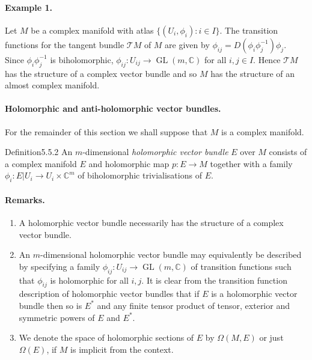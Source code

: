 \paragraph{Example 1.} Let $M$ be a complex manifold with atlas $\{(U_i,\phi_i):i\in I\}$. The transition functions for the tangent bundle $\mathcal TM$ of $M$ are given by $\phi_{ij}=D(\phi_i\phi_j^{-1})\phi_j$. Since $\phi_i\phi_j^{-1}$ is biholomorphic, $\phi_{ij}:U_{ij}\to\operatorname{GL}(m,\mathbb C)$ for all $i,j\in I$. Hence $\mathcal TM$ has the structure of a complex vector bundle and so $M$ has the structure of an almost complex manifold.
\paragraph{Holomorphic and anti-holomorphic vector bundles.} For the remainder of this section we shall suppose that $M$ is a complex manifold.
\begin{originaltheorem}{Definition}{5.5.2}
An $m$-dimensional \emph{holomorphic vector bundle} $E$ over $M$ consists of a complex manifold $E$ and holomorphic map $p:E\to M$ together with a family $\phi_i:E|U_i\to U_i\times\mathbb C^m$ of biholomorphic trivialisations of $E$.
\end{originaltheorem}
\paragraph{Remarks.}
\begin{enumerate}
\item A holomorphic vector bundle necessarily has the structure of a complex vector bundle.
\item An $m$-dimensional holomorphic vector bundle may equivalently be described by specifying a family $\phi_{ij}:U_{ij}\to\operatorname{GL}(m,\mathbb C)$ of transition functions such that $\phi_{ij}$ is holomorphic for all $i,j$. It is clear from the transition function description of holomorphic vector bundles that if $E$ is a holomorphic vector bundle then so is $E^*$ and any finite tensor product of tensor, exterior and symmetric powers of $E$ and $E^*$.
\item We denote the space of holomorphic sections of $E$ by $\Omega(M,E)$ or just $\Omega(E)$, if $M$ is implicit from the context.
\end{enumerate}
